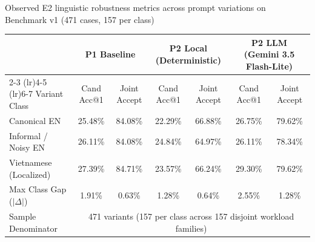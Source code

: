 \begin{table}[ht]{Observed E2 linguistic robustness metrics across prompt variations on Benchmark v1 (471 cases, 157 per class)}
\label{tab:e2-results}
\centering
\small
\begin{tabular}{lcccccc}
\toprule
& \multicolumn{2}{c}{P1 Baseline} & \multicolumn{2}{c}{P2 Local (Deterministic)} & \multicolumn{2}{c}{P2 LLM (Gemini 3.5 Flash-Lite)} \\
\cmidrule(lr){2-3} \cmidrule(lr){4-5} \cmidrule(lr){6-7}
Variant Class & Cand Acc@1 & Joint Accept & Cand Acc@1 & Joint Accept & Cand Acc@1 & Joint Accept \\
\midrule
Canonical EN & 25.48\% & 84.08\% & 22.29\% & 66.88\% & 26.75\% & 79.62\% \\
Informal / Noisy EN & 26.11\% & 84.08\% & 24.84\% & 64.97\% & 26.11\% & 78.34\% \\
Vietnamese (Localized) & 27.39\% & 84.71\% & 23.57\% & 66.24\% & 29.30\% & 79.62\% \\
\midrule
Max Class Gap ($|\Delta|$) & 1.91\% & 0.63\% & 1.28\% & 0.64\% & 2.55\% & 1.28\% \\
Sample Denominator & \multicolumn{6}{c}{471 variants (157 per class across 157 disjoint workload families)} \\
\bottomrule
\end{tabular}
\end{table}
